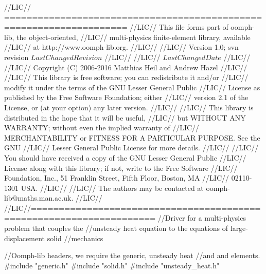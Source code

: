 \begin{DoxyCodeInclude}
\textcolor{comment}{//LIC// ====================================================================}
\textcolor{comment}{//LIC// This file forms part of oomph-lib, the object-oriented, }
\textcolor{comment}{//LIC// multi-physics finite-element library, available }
\textcolor{comment}{//LIC// at http://www.oomph-lib.org.}
\textcolor{comment}{//LIC// }
\textcolor{comment}{//LIC//    Version 1.0; svn revision $LastChangedRevision$}
\textcolor{comment}{//LIC//}
\textcolor{comment}{//LIC// $LastChangedDate$}
\textcolor{comment}{//LIC// }
\textcolor{comment}{//LIC// Copyright (C) 2006-2016 Matthias Heil and Andrew Hazel}
\textcolor{comment}{//LIC// }
\textcolor{comment}{//LIC// This library is free software; you can redistribute it and/or}
\textcolor{comment}{//LIC// modify it under the terms of the GNU Lesser General Public}
\textcolor{comment}{//LIC// License as published by the Free Software Foundation; either}
\textcolor{comment}{//LIC// version 2.1 of the License, or (at your option) any later version.}
\textcolor{comment}{//LIC// }
\textcolor{comment}{//LIC// This library is distributed in the hope that it will be useful,}
\textcolor{comment}{//LIC// but WITHOUT ANY WARRANTY; without even the implied warranty of}
\textcolor{comment}{//LIC// MERCHANTABILITY or FITNESS FOR A PARTICULAR PURPOSE.  See the GNU}
\textcolor{comment}{//LIC// Lesser General Public License for more details.}
\textcolor{comment}{//LIC// }
\textcolor{comment}{//LIC// You should have received a copy of the GNU Lesser General Public}
\textcolor{comment}{//LIC// License along with this library; if not, write to the Free Software}
\textcolor{comment}{//LIC// Foundation, Inc., 51 Franklin Street, Fifth Floor, Boston, MA}
\textcolor{comment}{//LIC// 02110-1301  USA.}
\textcolor{comment}{//LIC// }
\textcolor{comment}{//LIC// The authors may be contacted at oomph-lib@maths.man.ac.uk.}
\textcolor{comment}{//LIC// }
\textcolor{comment}{//LIC//====================================================================}
\textcolor{comment}{//Driver for a multi-physics problem that couples the }
\textcolor{comment}{//unsteady heat equation to the equations of large-displacement solid}
\textcolor{comment}{//mechanics}

\textcolor{comment}{//Oomph-lib headers, we require the generic, unsteady heat}
\textcolor{comment}{//and and elements.}
\textcolor{preprocessor}{#include "generic.h"}
\textcolor{preprocessor}{#include "solid.h"}
\textcolor{preprocessor}{#include "unsteady\_heat.h"}


\end{DoxyCodeInclude}

